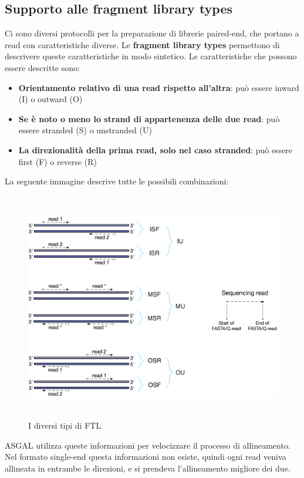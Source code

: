 \newpage

\subsection{Supporto alle fragment library types}
Ci sono diversi protocolli per la preparazione di librerie paired-end, che portano a read con caratteristiche diverse. Le \textbf{fragment library types} permettono di descrivere queste caratteristiche in modo sintetico. Le caratteristiche che possono essere descritte sono:
\begin{itemize}
	\item \textbf{Orientamento relativo di una read rispetto all'altra}: può essere inward (I) o outward (O)
	\item \textbf{Se è noto o meno lo strand di appartenenza delle due read}:  può essere stranded (S) o unstranded (U)
	\item \textbf{La direzionalità della prima read, solo nel caso stranded}: può essere first (F) o reverse (R)
\end{itemize}

La seguente immagine descrive tutte le possibili combinazioni:
\begin{figure}[h!]
	\centering
	\includegraphics[width=\linewidth, height=10cm]{images/fragmentlibrarytypes.png}
  \caption{I diversi tipi di FTL}
  \label{fig:FragmentLibraryTypes}
\end{figure}

\newpage

ASGAL utilizza queste informazioni per velocizzare il processo di allineamento. Nel formato single-end questa informazioni non esiste, quindi ogni read veniva allineata in entrambe le direzioni, e si prendeva l'allineamento migliore dei due. 

